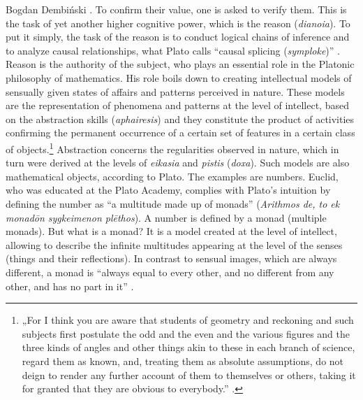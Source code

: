 \begin{artengenv}{Bogdan Dembiński}
\parencite[\textit{Meno}, 85c.98a.97c]{plato_platonis_1955}.
To confirm their value, one is asked to verify them. This is
the task of yet another higher cognitive power, which is the reason (\textit{dianoia}). To put it
simply, the task of the reason is to conduct logical chains of inference and to analyze causal relationships, what Plato
calls ``causal splicing (\textit{symploke})''
\parencite[\textit{Meno}, 97e-98a]{plato_platonis_1955}.
 Reason is the
authority of the subject, who plays an essential role in the Platonic philosophy of mathematics. His role boils down
to creating intellectual models of sensually given states of affairs and patterns perceived in nature. These models are
the representation of phenomena and patterns at the level of intellect, based on the abstraction skills
(\textit{aphairesis}) and they constitute the product of activities confirming the permanent occurrence of a
certain set of features in a certain class of objects.\footnote{„For I think you are aware that students of geometry
and reckoning and such subjects first postulate the odd and the even and the various figures and the three kinds of
angles and other things akin to these in each branch of science, regard them as known, and, treating them as absolute
assumptions, do not deign to render any further account of them to themselves or others, taking it for granted that
they are obvious to everybody.''
\parencite[\textit{Republic}, 510c]{plato_platonis_1955}.
} Abstraction concerns the
regularities observed in nature, which in turn were derived at the levels of \textit{eikasia} and \textit{pistis}
(\textit{doxa}). Such models are also mathematical %
objects, according to Plato. The examples are numbers. Euclid, who was educated at the Plato Academy, complies with
Plato’s intuition by defining the number as ``a multitude made up of monads'' (\textit{Arithmos de, to ek monad\=on
sygkeimenon pl\=ethos}). A number is defined by a monad (multiple monads). But what is a monad? It is a model created
at the level of intellect, allowing to describe the infinite multitudes appearing at the level of the senses (things
and their reflections). In contrast to sensual images, which are always different, a monad is ``always equal to every
other, and no different from any other, and has no part in it''
\parencite[\textit{Republic}, 526a]{plato_platonis_1955}.

\end{artengenv}

